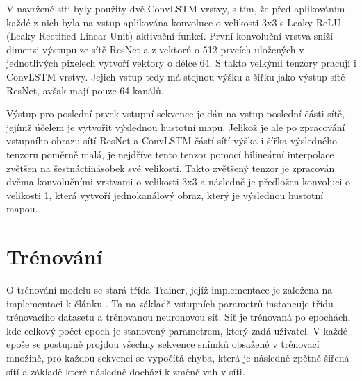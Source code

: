 V navržené síti byly použity dvě ConvLSTM vrstvy, s tím, že před aplikováním každé z nich byla na vstup aplikována konvoluce o velikosti 3x3 s Leaky ReLU (Leaky Rectified Linear Unit) \cite{LeakyReLU} aktivační funkcí.
První konvoluční vrstva sníží dimenzi výstupu ze sítě ResNet a z vektorů o 512 prvcích uložených v jednotlivých pixelech vytvoří vektory o délce 64. 
S takto velkými tenzory pracují i ConvLSTM vrstvy.
Jejich vstup tedy má stejnou výšku a šířku jako výstup sítě ResNet, avšak mají pouze 64 kanálů.

Výstup pro poslední prvek vstupní sekvence je dán na vstup poslední části sítě, jejímž účelem je vytvořit výslednou hustotní mapu.
Jelikož je ale po zpracování vstupního obrazu sítí ResNet a ConvLSTM částí sítí výška i šířka výsledného tenzoru poměrně malá, je nejdříve tento tenzor pomocí bilineární interpolace zvětšen na šestnáctinásobek své velikosti.
Takto zvětšený tenzor je zpracován dvěma konvolučními vrstvami o velikosti 3x3 a následně je předložen konvoluci o velikosti 1, která vytvoří jednokanálový obraz, který je výslednou hustotní mapou.

\section{Trénování}
O trénování modelu se stará třída Trainer, jejíž implementace je založena na implementaci k článku \cite{DM_Count}.
Ta na základě vstupních parametrů instancuje třídu trénovacího datasetu a trénovanou neuronovou síť.
Síť je trénovaná po epochách, kde celkový počet epoch je stanovený parametrem, který zadá uživatel.
V každé epoše se postupně projdou všechny sekvence snímků obsažené v trénovací množině, pro každou sekvenci se vypočítá chyba, která je následně zpětně šířená sítí a základě které následně dochází k změně vah v síti.










\endinput